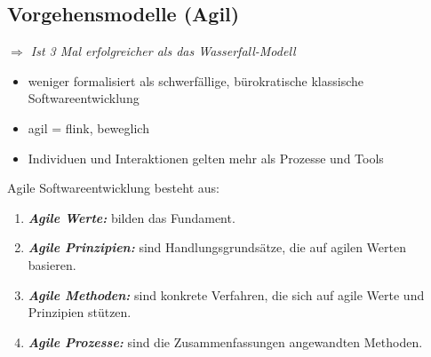 \subsection{Vorgehensmodelle (Agil)}
\textit{$\Rightarrow$ Ist 3 Mal erfolgreicher als das Wasserfall-Modell}
\begin{itemize}
	\item weniger formalisiert als schwerfällige, \newline
    bürokratische klassische Softwareentwicklung
	\item agil = flink, beweglich
	\item Individuen und Interaktionen gelten mehr als Prozesse und Tools
\end{itemize}
\vspace{0.5cm}
Agile Softwareentwicklung besteht aus:
\begin{enumerate}
	\item \textbf{\textit{Agile Werte:}} bilden das Fundament.
	\item \textbf{\textit{Agile Prinzipien:}} sind Handlungsgrundsätze, die auf agilen Werten basieren.
	\item \textbf{\textit{Agile Methoden:}} sind konkrete Verfahren, die sich auf agile Werte und Prinzipien stützen.
	\item \textbf{\textit{Agile Prozesse:}} sind die Zusammenfassungen angewandten Methoden.
	\\ 
\end{enumerate}
\pagebreak
